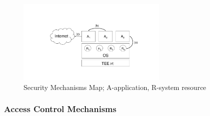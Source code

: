 
\begin{figure}[t!]
	\centering
	\includegraphics[width=0.65\textwidth]{img/relwork.pdf}
	\caption{Security Mechanisms Map; A-application, R-system resource}
	\label{fig:relwork}
\end{figure}

\subsubsection{Access Control Mechanisms}


